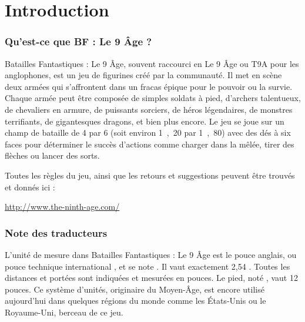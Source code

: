 
\part{Introduction}

\section{Qu'est-ce que BF : Le 9\ieme{} Âge ?}

Batailles Fantastiques : Le 9\ieme{} Âge, souvent raccourci en Le 9\ieme{} Âge ou T9A pour les anglophones, est un jeu de figurines créé par la communauté. Il met en scène deux armées qui s'affrontent dans un fracas épique pour le pouvoir ou la survie. Chaque armée peut être composée de simples soldats à pied, d'archers talentueux, de chevaliers en armure, de puissants sorciers, de héros légendaires, de monstres terrifiants, de gigantesques dragons, et bien plus encore. Le jeu se joue sur un champ de bataille de \unit{4}{\foot} par \unit{6}{\foot} (soit environ \unit{1,20}{\meter} par \unit{1,80}{\meter}) avec des dés à six faces pour déterminer le succès d'actions comme charger dans la mêlée, tirer des flèches ou lancer des sorts.

Toutes les règles du jeu, ainsi que les retours et suggestions peuvent être trouvés et donnés ici :

\begin{center}
\url{http://www.the-ninth-age.com/}
\end{center}


\newpage
\section{Note des traducteurs}

L'unité de mesure dans Batailles Fantastiques : Le 9\ieme{} Âge est le pouce anglais, ou \og pouce technique international \fg{}, et se note \inch{}. Il vaut exactement 2,54 {\centi\meter}. Toutes les distances et portées sont indiquées et mesurées en pouces. Le pied, noté \foot{}, vaut 12 pouces. Ce système d'unités, originaire du Moyen-Âge, est encore utilisé aujourd'hui dans quelques régions du monde comme les États-Unis ou le Royaume-Uni, berceau de ce jeu.

